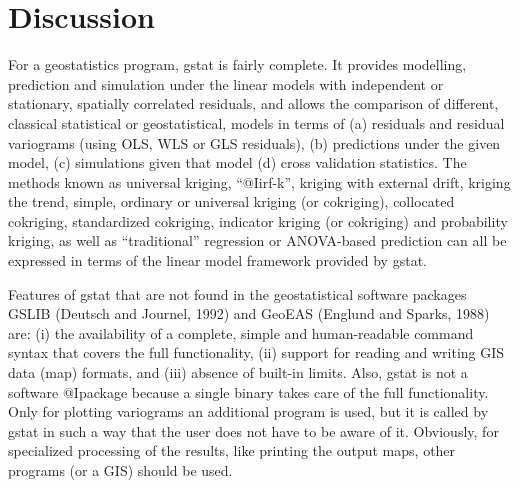 \documentclass{article}
\begin{document}
\section{ Discussion }
\label{ discussion }

For a geostatistics program, gstat is fairly complete. It provides
modelling, prediction and simulation under the linear models with
independent or stationary, spatially correlated residuals, and allows
the comparison of different, classical statistical or geostatistical,
models in terms of (a) residuals and residual variograms (using OLS, WLS
or GLS residuals), (b) predictions under the given model, (c)
simulations given that model (d) cross validation statistics. The
methods known as universal kriging, ``@I{irf-k}'', kriging with external
drift, kriging the trend, simple, ordinary or universal kriging (or
cokriging), collocated cokriging, standardized cokriging, indicator
kriging (or cokriging) and probability kriging, as well as
``traditional'' regression or ANOVA-based prediction can all be
expressed in terms of the linear model framework provided by gstat.

Features of gstat that are not found in the geostatistical software
packages GSLIB (Deutsch and Journel, 1992) and GeoEAS (Englund and
Sparks, 1988) are:
(i) the availability of a complete, simple and human-readable command
syntax that covers the full functionality,
(ii) support for reading and writing GIS data (map) formats, and
(iii) absence of built-in limits.
Also, gstat is not a software @I{package} because a single binary takes
care of the full functionality. Only for plotting variograms an
additional program is used, but it is called by gstat in such a way that
the user does not have to be aware of it.  Obviously, for specialized
processing of the results, like printing the output maps, other programs
(or a GIS) should be used.
\end{document}
